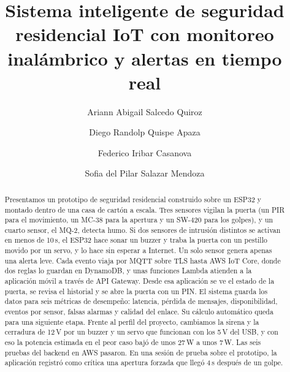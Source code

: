\documentclass[manuscript,screen,nonacm]{acmart}
\begin{document}
\title[Seguridad residencial IoT]{Sistema inteligente de seguridad residencial IoT con monitoreo inalámbrico y alertas en tiempo real}

\author{Ariann Abigail Salcedo Quiroz}
\author{Diego Randolp Quispe Apaza}
\author{Federico Iribar Casanova}
\author{Sofia del Pilar Salazar Mendoza}
\renewcommand{\shortauthors}{Salcedo, Quispe, Iribar y Salazar}

\begin{abstract}
Presentamos un prototipo de seguridad residencial construido sobre un ESP32 y montado dentro de una casa de cartón a escala. Tres sensores vigilan la puerta (un PIR para el movimiento, un MC-38 para la apertura y un SW-420 para los golpes), y un cuarto sensor, el MQ-2, detecta humo. Si dos sensores de intrusión distintos se activan en menos de 10\,s, el ESP32 hace sonar un buzzer y traba la puerta con un pestillo movido por un servo, y lo hace sin esperar a Internet. Un solo sensor genera apenas una alerta leve. Cada evento viaja por MQTT sobre TLS hasta AWS IoT Core, donde dos reglas lo guardan en DynamoDB, y unas funciones Lambda atienden a la aplicación móvil a través de API Gateway. Desde esa aplicación se ve el estado de la puerta, se revisa el historial y se abre la puerta con un PIN. El sistema guarda los datos para seis métricas de desempeño: latencia, pérdida de mensajes, disponibilidad, eventos por sensor, falsas alarmas y calidad del enlace. Su cálculo automático queda para una siguiente etapa. Frente al perfil del proyecto, cambiamos la sirena y la cerradura de 12\,V por un buzzer y un servo que funcionan con los 5\,V del USB, y con eso la potencia estimada en el peor caso bajó de unos 27\,W a unos 7\,W. Las seis pruebas del backend en AWS pasaron. En una sesión de prueba sobre el prototipo, la aplicación registró como crítica una apertura forzada que llegó 4\,s después de un golpe.
\end{abstract}


\maketitle
\end{document}
